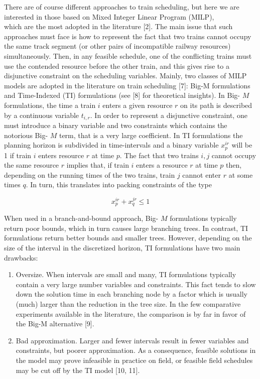 \documentclass[10pt]{article}
\begin{document}
There are of course different approaches to train scheduling, but here we are interested in those based on Mixed Integer Linear Program (MILP),\\[0pt]
which are the most adopted in the literature [2]. The main issue that such approaches must face is how to represent the fact that two trains cannot occupy the same track segment (or other pairs of incompatible railway resources) simultaneously. Then, in any feasible schedule, one of the conflicting trains must use the contended resource before the other train, and this gives rise to a disjunctive constraint on the scheduling variables. Mainly, two classes of MILP models are adopted in the literature on train scheduling [7]: Big-M formulations and Time-Indexed (TI) formulations (see [8] for theoretical insights). In Big- $M$ formulations, the time a train $i$ enters a given resource $r$ on its path is described by a continuous variable $t_{i, r}$. In order to represent a disjunctive constraint, one must introduce a binary variable and two constraints which contains the notorious Big- $M$ term, that is a very large coefficient. In TI formulations the planning horizon is subdivided in time-intervals and a binary variable $x_{p}^{i r}$ will be 1 if train $i$ enters resource $r$ at time $p$. The fact that two trains $i, j$ cannot occupy the same resource $r$ implies that, if train $i$ enters a resource $r$ at time $p$ then, depending on the running times of the two trains, train $j$ cannot enter $r$ at some times $q$. In turn, this translates into packing constraints of the type


\begin{equation*}
x_{p}^{i r}+x_{q}^{j r} \leq 1 \tag{1}
\end{equation*}


When used in a branch-and-bound approach, Big- $M$ formulations typically return poor bounds, which in turn causes large branching trees. In contrast, TI formulations return better bounds and smaller trees. However, depending on the size of the interval in the discretized horizon, TI formulations have two main drawbacks:

\begin{enumerate}
  \item Oversize. When intervals are small and many, TI formulations typically contain a very large number variables and constraints. This fact tends to slow down the solution time in each branching node by a factor which is usually (much) larger than the reduction in the tree size. In the few comparative experiments available in the literature, the comparison is by far in favor of the Big-M alternative [9].
  \item Bad approximation. Larger and fewer intervals result in fewer variables and constraints, but poorer approximation. As a consequence, feasible solutions in the model may prove infeasible in practice on field, or feasible field schedules may be cut off by the TI model [10, 11].
\end{enumerate}
\end{document}
